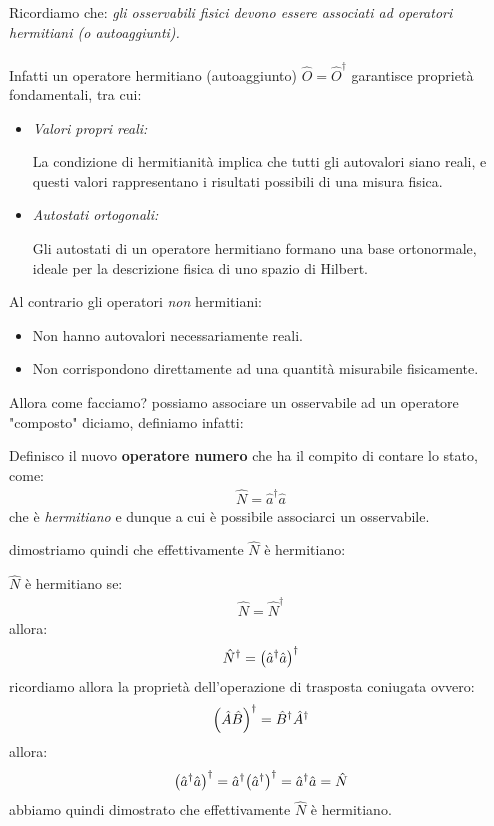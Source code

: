 \begin{myapprf}
	Ricordiamo che: \textit{gli osservabili fisici devono essere associati ad operatori hermitiani (o autoaggiunti).}
	\\
	\\
	Infatti un operatore hermitiano (autoaggiunto) $\hat{O} = \hat{O}^{\dagger}$ garantisce proprietà fondamentali, tra cui:
\begin{itemize}
	\item \textit{Valori propri reali:}
	
		La condizione di hermitianità implica che tutti gli autovalori siano reali, e questi valori rappresentano i risultati possibili di una misura fisica.
		
	\item \textit{Autostati ortogonali:}
	
		Gli autostati di un operatore hermitiano formano una base ortonormale, ideale per la descrizione fisica di uno spazio di Hilbert.
\end{itemize}

	Al contrario gli operatori \textit{non} hermitiani:
	
\begin{itemize}
	\item Non hanno autovalori necessariamente reali.
	\item Non corrispondono direttamente ad una quantità misurabile fisicamente.
\end{itemize}
\end{myapprf}

	Allora come facciamo? possiamo associare un osservabile ad un operatore "composto" diciamo, definiamo infatti:
	
\begin{mydef}
	Definisco il nuovo \textbf{operatore numero} che ha il compito di contare lo stato, come:
\begin{align*}
	\hat{N} = \hat{a}^{\dagger}\hat{a}
\end{align*}
	che è \textit{hermitiano} e dunque a cui è possibile associarci un osservabile.
\end{mydef}

	dimostriamo quindi che effettivamente $\hat{N}$ è hermitiano:
	
\begin{myprf}
	$\hat{N}$ è hermitiano se:
\begin{align*}
	\hat{N} = \hat{N}^{\dagger}
\end{align*}
	allora:
\begin{align*}
	\hat{N}^{\dagger} = \qty(\hat{a}^{\dagger}\hat{a})^{\dagger}
\end{align*}	
	ricordiamo allora la proprietà dell'operazione di trasposta coniugata ovvero:
\begin{align*}
	\qty(\hat{A}\hat{B})^{\dagger} = \hat{B}^{\dagger}\hat{A}^{\dagger}
\end{align*}
	allora:
\begin{align*}
	\qty(\hat{a}^{\dagger}\hat{a})^{\dagger} = \hat{a}^{\dagger} \qty(\hat{a}^{\dagger})^{\dagger} = \hat{a}^{\dagger} \hat{a} = \hat{N}
\end{align*}
	abbiamo quindi dimostrato che effettivamente $\hat{N}$ è hermitiano.
\end{myprf}

